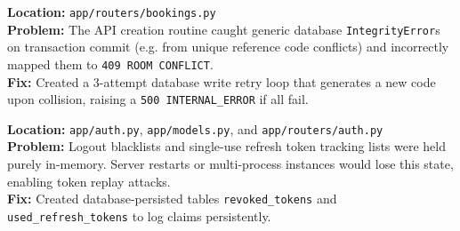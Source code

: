 \documentclass[11pt,a4paper]{article}
\begin{document}
\begin{tcolorbox}[colback=yellow!5!white,colframe=yellow!75!black,title=Bug 13: Concurrency Reference Code Collision Error Mapping (Error Masquerade)]
\textbf{Location:} \texttt{app/routers/bookings.py}\\
\textbf{Problem:} The API creation routine caught generic database \texttt{IntegrityError}s on transaction commit (e.g. from unique reference code conflicts) and incorrectly mapped them to \texttt{409 ROOM CONFLICT}.\\
\textbf{Fix:} Created a 3-attempt database write retry loop that generates a new code upon collision, raising a \texttt{500 INTERNAL\_ERROR} if all fail.
\end{tcolorbox}

\begin{tcolorbox}[colback=red!5!white,colframe=red!75!black,title=Bug 14: In-Memory Token Revocation Persistence Loss]
\textbf{Location:} \texttt{app/auth.py}, \texttt{app/models.py}, and \texttt{app/routers/auth.py}\\
\textbf{Problem:} Logout blacklists and single-use refresh token tracking lists were held purely in-memory. Server restarts or multi-process instances would lose this state, enabling token replay attacks.\\
\textbf{Fix:} Created database-persisted tables \texttt{revoked\_tokens} and \texttt{used\_refresh\_tokens} to log claims persistently.
\end{tcolorbox}
\end{document}
